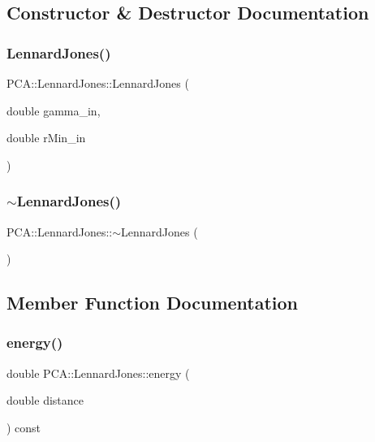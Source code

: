 \subsection{Constructor \& Destructor Documentation}
\hypertarget{class_p_c_a_1_1_lennard_jones_a177de9041d696f41ac2b498973047759}{}\label{class_p_c_a_1_1_lennard_jones_a177de9041d696f41ac2b498973047759} 
\subsubsection{\texorpdfstring{Lennard\+Jones()}{LennardJones()}}
{\footnotesize\ttfamily P\+C\+A\+::\+Lennard\+Jones\+::\+Lennard\+Jones (\begin{DoxyParamCaption}\item[{double}]{gamma\+\_\+in,  }\item[{double}]{r\+Min\+\_\+in }\end{DoxyParamCaption})}

\hypertarget{class_p_c_a_1_1_lennard_jones_ac8acfe0ebd2e7f263d6561ab515f0028}{}\label{class_p_c_a_1_1_lennard_jones_ac8acfe0ebd2e7f263d6561ab515f0028} 
\subsubsection{\texorpdfstring{$\sim$\+Lennard\+Jones()}{~LennardJones()}}
{\footnotesize\ttfamily P\+C\+A\+::\+Lennard\+Jones\+::$\sim$\+Lennard\+Jones (\begin{DoxyParamCaption}{ }\end{DoxyParamCaption})}



\subsection{Member Function Documentation}
\hypertarget{class_p_c_a_1_1_lennard_jones_a5021c95edaa07f8a82c685616b5e6114}{}\label{class_p_c_a_1_1_lennard_jones_a5021c95edaa07f8a82c685616b5e6114} 
\subsubsection{\texorpdfstring{energy()}{energy()}}
{\footnotesize\ttfamily double P\+C\+A\+::\+Lennard\+Jones\+::energy (\begin{DoxyParamCaption}\item[{double}]{distance }\end{DoxyParamCaption}) const}

